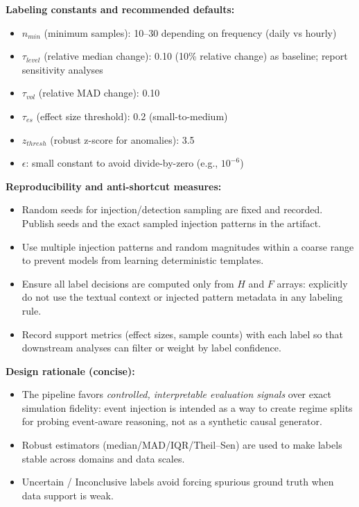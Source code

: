 \vspace{6pt}
\noindent\textbf{Labeling constants and recommended defaults:}
\begin{itemize}
  \item $n_{min}$ (minimum samples): 10--30 depending on frequency (daily vs hourly)
  \item $\tau_{level}$ (relative median change): 0.10 (10\% relative change) as baseline; report sensitivity analyses
  \item $\tau_{vol}$ (relative MAD change): 0.10
  \item $\tau_{es}$ (effect size threshold): 0.2 (small-to-medium)
  \item $z_{thresh}$ (robust z-score for anomalies): 3.5
  \item $\epsilon$: small constant to avoid divide-by-zero (e.g., $10^{-6}$)
\end{itemize}

\vspace{6pt}
\noindent\textbf{Reproducibility and anti-shortcut measures:}
\begin{itemize}
  \item Random seeds for injection/detection sampling are fixed and recorded. Publish seeds and the exact sampled injection patterns in the artifact.
  \item Use multiple injection patterns and random magnitudes within a coarse range to prevent models from learning deterministic templates.
  \item Ensure all label decisions are computed only from $H$ and $F$ arrays: explicitly do not use the textual context or injected pattern metadata in any labeling rule.
  \item Record support metrics (effect sizes, sample counts) with each label so that downstream analyses can filter or weight by label confidence.
\end{itemize}

\vspace{6pt}
\noindent\textbf{Design rationale (concise):}
\begin{itemize}
  \item The pipeline favors \emph{controlled, interpretable evaluation signals} over exact simulation fidelity: event injection is intended as a way to create regime splits for probing event-aware reasoning, not as a synthetic causal generator.
  \item Robust estimators (median/MAD/IQR/Theil--Sen) are used to make labels stable across domains and data scales.
  \item Uncertain / Inconclusive labels avoid forcing spurious ground truth when data support is weak.
\end{itemize}



